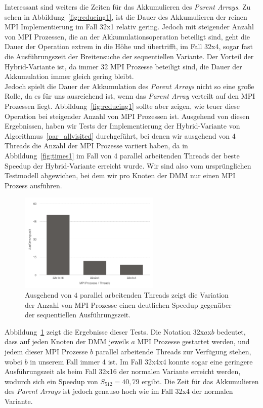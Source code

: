 \documentclass[11pt,a4paper]{article}
\begin{document}
Interessant sind weiters die Zeiten für das Akkumulieren des \textit{Parent Arrays}. Zu sehen in Abbildung~\ref{fig:reducing1}, ist die Dauer des Akkumulieren der reinen MPI Implementierung im Fall 32x1 relativ gering. Jedoch mit steigender Anzahl von MPI Prozessen, die an der Akkumulationsoperation beteiligt sind, geht die Dauer der Operation extrem in die Höhe und übertrifft, im Fall 32x4, sogar fast die Ausführungszeit der Breitensuche der sequentiellen Variante. Der Vorteil der Hybrid-Variante ist, da immer 32 MPI Prozesse beteiligt sind, die Dauer der Akkumulation immer gleich gering bleibt.\\
Jedoch spielt die Dauer der Akkumulation des \textit{Parent Arrays} nicht so eine große Rolle, da es für uns ausreichend ist, wenn das \textit{Parent Array} verteilt auf den MPI Prozessen liegt. Abbildung~\ref{fig:reducing1} sollte aber zeigen, wie teuer diese Operation bei steigender Anzahl von MPI Prozessen ist. Ausgehend von diesen Ergebnissen, haben wir Tests der Implementierung der Hybrid-Variante von Algorithmus~\ref{par_allvisited} durchgeführt, bei denen wir ausgehend von 4 Threads die Anzahl der MPI Prozesse variiert haben, da in Abbildung~\ref{fig:times1} im Fall von 4 parallel arbeitenden Threads der beste Speedup der Hybrid-Variante erreicht wurde. Wir sind also vom ursprünglichen Testmodell abgewichen, bei dem wir pro Knoten der DMM nur einen MPI Prozess ausführen.
\begin{figure}[h]
 	\centering
	\includegraphics[width=0.6\textwidth]{hybrid_variations}
 	\caption{Ausgehend von \(4\) parallel arbeitenden Threads zeigt die Variation der Anzahl von MPI Prozesse einen deutlichen Speedup gegenüber der sequentiellen Ausführungszeit.}
	\label{fig:hybridvariations}
\end{figure}
Abbildung~\ref{fig:hybridvariations} zeigt die Ergebnisse dieser Tests. Die Notation 32x\(a\)x\(b\) bedeutet, dass auf jeden Knoten der DMM jeweils \(a\) MPI Prozesse gestartet werden, und jedem dieser MPI Prozesse \(b\) parallel arbeitende Threads zur Verfügung stehen, wobei \(b\) in unserem Fall immer 4 ist. Im Fall 32x4x4 konnte sogar eine geringere Ausführungszeit als beim Fall 32x16 der normalen Variante erreicht werden, wodurch sich ein Speedup von \(S_{512} = 40,79\) ergibt. Die Zeit für das Akkumulieren des \textit{Parent Arrays} ist jedoch genauso hoch wie im Fall 32x4 der normalen Variante.
\clearpage


\clearpage
\appendix
\end{document}
